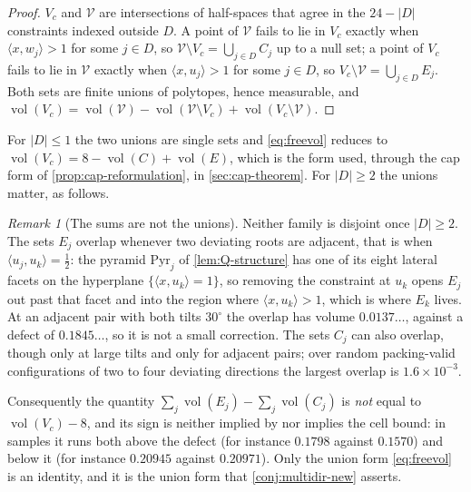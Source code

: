 \documentclass[11pt,reqno]{amsart}
\renewcommand{\_}{\origunderscore\allowbreak}
\numberwithin{equation}{section}
\theoremstyle{plain}
\theoremstyle{definition}
\theoremstyle{remark}
\newtheorem{remark}[thm]{Remark}
\newcommand{\VCell}{\mathcal{V}}             %
\newcommand{\base}{u}                        %
\DeclareMathOperator{\vol}{vol}
\begin{document}
\begin{proof}
$V_c$ and $\VCell$ are intersections of half-spaces that agree in the
$24-|D|$ constraints indexed outside $D$. A point of $\VCell$ fails to
lie in $V_c$ exactly when $\langle x,w_j\rangle>1$ for some $j\in D$, so
$\VCell\setminus V_c=\bigcup_{j\in D}C_j$ up to a null set; a point of
$V_c$ fails to lie in $\VCell$ exactly when $\langle
x,\base_j\rangle>1$ for some $j\in D$, so $V_c\setminus\VCell=\bigcup_{j\in
D}E_j$. Both sets are finite unions of polytopes, hence measurable, and
$\vol(V_c)=\vol(\VCell)-\vol(\VCell\setminus V_c)+\vol(V_c\setminus\VCell)$.
\end{proof}

For $|D|\le1$ the two unions are single sets and \eqref{eq:freevol}
reduces to $\vol(V_c)=8-\vol(C)+\vol(E)$, which is the form used, through
the cap form of \cref{prop:cap-reformulation}, in \cref{sec:cap-theorem}.
For $|D|\ge2$ the unions matter, as follows.

\begin{remark}[The sums are not the unions]\label{rem:sums-not-unions}
Neither family is disjoint once $|D|\ge2$. The sets $E_j$ overlap
whenever two deviating roots are adjacent, that is when
$\langle\base_j,\base_k\rangle=\tfrac12$: the pyramid $\mathrm{Pyr}_j$ of
\cref{lem:Q-structure} has one of its eight lateral facets on the
hyperplane $\{\langle x,\base_k\rangle=1\}$, so removing the constraint
at $\base_k$ opens $E_j$ out past that facet and into the region where
$\langle x,\base_k\rangle>1$, which is where $E_k$ lives. At an adjacent
pair with both tilts $30^\circ$ the overlap has volume $0.0137\ldots$,
against a defect of $0.1845\ldots$, so it is not a small correction. The
sets $C_j$ can also overlap, though only at large tilts and only for
adjacent pairs; over random packing-valid configurations of two to four
deviating directions the largest overlap is $1.6\times10^{-3}$.

Consequently the quantity $\sum_j\vol(E_j)-\sum_j\vol(C_j)$ is
\emph{not} equal to $\vol(V_c)-8$, and its sign is neither implied by
nor implies the cell bound: in samples it runs both above the defect
(for instance $0.1798$ against $0.1570$) and below it (for instance
$0.20945$ against $0.20971$). Only the union form \eqref{eq:freevol} is
an identity, and it is the union form that
\cref{conj:multidir-new} asserts.
\end{remark}
\end{document}
